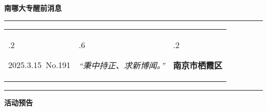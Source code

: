 \documentclass[letterpaper, 12pt]{article}
\begin{document}
\begin{center}
    \Huge\textbf{南哪大专醒前消息}
\end{center}
\vspace{4mm}
\hrule
\renewcommand\tabularxcolumn[1]{m{#1}}
\begin{tabularx}{\textwidth}{>{\hsize.2\hsize}X>{\hsize.6\hsize}X>{\hsize.2\hsize}X}
    \begin{flushleft}
        2025.3.15\, No.191
    \end{flushleft}
    &
    \begin{center}
        \textit{“秉中持正、求新博闻。”}
    \end{center}
    &
    \begin{flushright}
        \textbf{南京市栖霞区}
    \end{flushright}
\end{tabularx}
\vspace{-3.5mm}
\hrule
\vspace{4mm}
\centerline{\huge\textbf{活动预告}}
\end{document}
